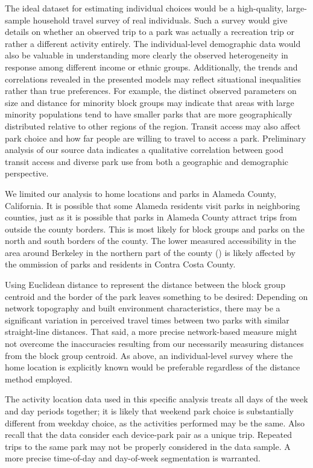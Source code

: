 \documentclass[3p, authoryear]{elsarticle} %
\begin{document}
The ideal dataset for estimating individual choices would be a high-quality,
large-sample household travel survey of real individuals. Such a survey would
give details on whether an observed trip to a park was actually a recreation
trip or rather a different activity entirely. The individual-level demographic
data would also be valuable in understanding more clearly the observed
heterogeneity in response among different income or ethnic groups. Additionally,
the trends and correlations revealed in the presented models may reflect
situational inequalities rather than true preferences. For example, the
distinct observed parameters on size and distance for minority block groups may
indicate that areas with large minority populations tend to have smaller parks
that are more geographically distributed relative to other regions of the region.
Transit access may also affect park choice and how far people are willing to
travel to access a park. Preliminary analysis of our source data indicates a
qualitative correlation between good transit access and diverse park use from
both a geographic and demographic perspective.

We limited our analysis to home locations and parks in Alameda County,
California. It is possible that some Alameda residents visit parks in
neighboring counties, just as it is possible that parks in Alameda County
attract trips from outside the county borders. This is most likely for block
groups and parks on the north and south borders of the county. The lower
measured accessibility in the area around Berkeley in the northern part of the
county () is likely affected by the ommission of parks and residents in Contra
Costa County.

Using Euclidean distance to represent the distance between the block group
centroid and the border of the park leaves something to be desired: Depending on
network topography and built environment characteristics, there may be a
significant variation in perceived travel times between two parks with similar
straight-line distances. That said, a more precise network-based measure might
not overcome the inaccuracies resulting from our necessarily measuring distances
from the block group centroid. As above, an individual-level survey where the
home location is explicitly known would be preferable regardless of the distance
method employed.

The activity location data used in this specific analysis treats all days of the
week and day periods together; it is likely that weekend park choice is
substantially different from weekday choice, as the activities performed may be
the same. Also recall that the data consider each device-park pair as a unique
trip. Repeated trips to the same park may not be properly considered in the data
sample. A more precise time-of-day and day-of-week segmentation is warranted.
\end{document}
